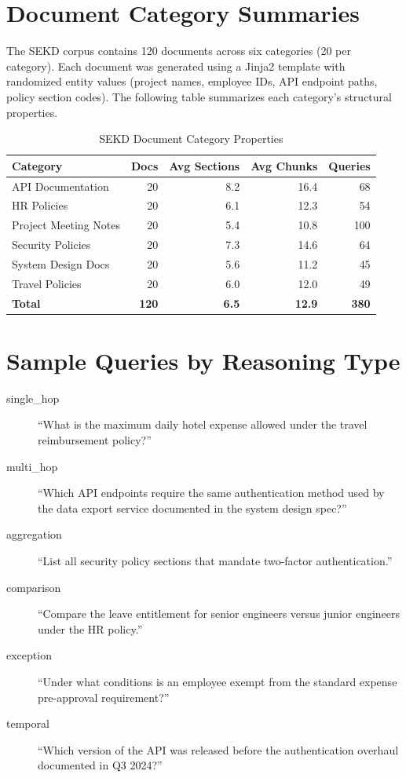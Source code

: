 \documentclass[12pt, a4paper, twoside]{report}
\begin{document}
\section{Document Category Summaries}

The SEKD corpus contains 120 documents across six categories (20 per category). Each document was generated using a Jinja2 template with randomized entity values (project names, employee IDs, API endpoint paths, policy section codes). The following table summarizes each category's structural properties.

\begin{table}[H]
\centering
\caption{SEKD Document Category Properties}
\label{tab:app_categories}
\begin{tabular}{lrrrr}
\toprule
\textbf{Category} & \textbf{Docs} & \textbf{Avg Sections} & \textbf{Avg Chunks} & \textbf{Queries} \\
\midrule
API Documentation     & 20 & 8.2  & 16.4 & 68  \\
HR Policies           & 20 & 6.1  & 12.3 & 54  \\
Project Meeting Notes & 20 & 5.4  & 10.8 & 100 \\
Security Policies     & 20 & 7.3  & 14.6 & 64  \\
System Design Docs    & 20 & 5.6  & 11.2 & 45  \\
Travel Policies       & 20 & 6.0  & 12.0 & 49  \\
\midrule
\textbf{Total}        & \textbf{120} & \textbf{6.5} & \textbf{12.9} & \textbf{380} \\
\bottomrule
\end{tabular}
\end{table}

\section{Sample Queries by Reasoning Type}

\begin{description}
    \item[single\_hop] ``What is the maximum daily hotel expense allowed under the travel reimbursement policy?''
    \item[multi\_hop] ``Which API endpoints require the same authentication method used by the data export service documented in the system design spec?''
    \item[aggregation] ``List all security policy sections that mandate two-factor authentication.''
    \item[comparison] ``Compare the leave entitlement for senior engineers versus junior engineers under the HR policy.''
    \item[exception] ``Under what conditions is an employee exempt from the standard expense pre-approval requirement?''
    \item[temporal] ``Which version of the API was released before the authentication overhaul documented in Q3 2024?''
\end{description}
\end{document}
